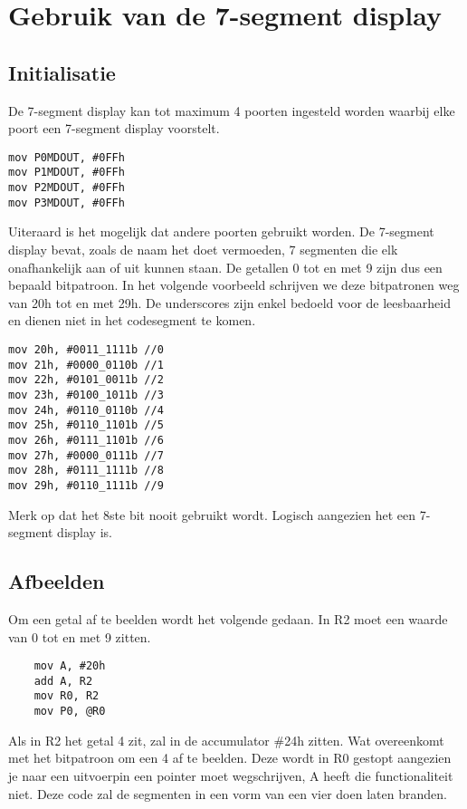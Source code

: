 \documentclass{report}
\begin{document}
\chapter{Gebruik van de 7-segment display}
\section{Initialisatie}
De 7-segment display kan tot maximum 4 poorten ingesteld worden waarbij elke poort een 7-segment display voorstelt.
\begin{lstlisting}
mov P0MDOUT, #0FFh
mov P1MDOUT, #0FFh
mov P2MDOUT, #0FFh
mov P3MDOUT, #0FFh
\end{lstlisting}
Uiteraard is het mogelijk dat andere poorten gebruikt worden.
\newline
De 7-segment display bevat, zoals de naam het doet vermoeden, 7 segmenten die elk onafhankelijk aan of uit kunnen staan. De getallen 0 tot en met 9 zijn dus een bepaald bitpatroon. In het volgende voorbeeld schrijven we deze bitpatronen weg van 20h tot en met 29h. De underscores zijn enkel bedoeld voor de leesbaarheid en dienen niet in het codesegment te komen.

\begin{lstlisting}
mov 20h, #0011_1111b //0 
mov 21h, #0000_0110b //1
mov 22h, #0101_0011b //2
mov 23h, #0100_1011b //3
mov 24h, #0110_0110b //4
mov 25h, #0110_1101b //5
mov 26h, #0111_1101b //6
mov 27h, #0000_0111b //7
mov 28h, #0111_1111b //8
mov 29h, #0110_1111b //9
\end{lstlisting}

Merk op dat het 8ste bit nooit gebruikt wordt. Logisch aangezien het een 7-segment display is.

\section{Afbeelden}
Om een getal af te beelden wordt het volgende gedaan. In R2 moet een waarde van 0 tot en met 9 zitten.
\begin{lstlisting}
	mov A, #20h
	add A, R2
	mov R0, R2
	mov P0, @R0
\end{lstlisting}

Als in R2 het getal 4 zit, zal in de accumulator \#24h zitten. Wat overeenkomt met het bitpatroon om een 4 af te beelden. Deze wordt in R0 gestopt aangezien je naar een uitvoerpin een pointer moet wegschrijven, A heeft die functionaliteit niet. Deze code zal de segmenten in een vorm van een vier doen laten branden.
\end{document}
